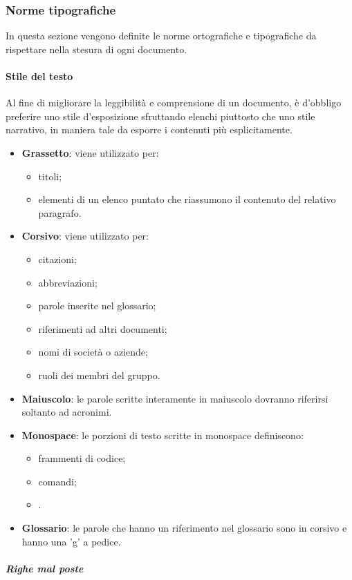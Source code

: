 \subsubsection{Norme tipografiche}
In questa sezione vengono definite le norme ortografiche e tipografiche da rispettare nella stesura di ogni documento.
 \paragraph{Stile del testo}
 Al fine di migliorare la leggibilità e comprensione di un documento, è d'obbligo preferire uno stile d'esposizione sfruttando elenchi piuttosto che uno stile narrativo, in maniera tale da esporre i contenuti più esplicitamente.
\begin{itemize}
	\item \textbf{Grassetto}: viene utilizzato per:
	\begin{itemize}
		\item titoli;
		\item elementi di un elenco puntato che riassumono il contenuto del relativo paragrafo.
	\end{itemize}
	\item \textbf{Corsivo}: viene utilizzato per:
	\begin{itemize}
		\item citazioni;
		\item abbreviazioni;
		\item parole inserite nel glossario;
		\item riferimenti ad altri documenti;
		\item nomi di società o aziende;
		\item ruoli dei membri del gruppo.
	\end{itemize}
	\item \textbf{Maiuscolo}: le parole scritte interamente in maiuscolo dovranno riferirsi soltanto ad acronimi.
	\item \textbf{Monospace}: le porzioni di testo scritte in monospace definiscono:
	\begin{itemize}
		\item frammenti di codice;
		\item comandi;
		\item {}.
	\end{itemize}
	\item \textbf{Glossario}: le parole che hanno un riferimento nel glossario sono in corsivo e hanno una 'g' a pedice.
\end{itemize}
\subparagraph{Righe mal poste}
